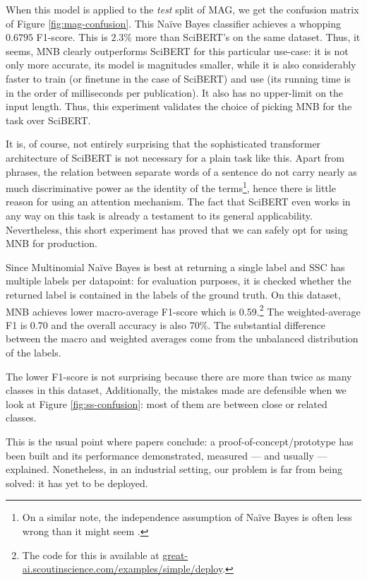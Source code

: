 When this model is applied to the \textit{test} split of MAG, we get the confusion matrix of Figure \ref{fig:mag-confusion}. This Naïve Bayes classifier achieves a whopping $0.6795$ F1-score. This is $2.3\%$ more than SciBERT's on the same dataset. Thus, it seems, MNB clearly outperforms SciBERT for this particular use-case: it is not only more accurate, its model is magnitudes smaller, while it is also considerably faster to train (or finetune in the case of SciBERT) and use (its running time is in the order of milliseconds per publication). It also has no upper-limit on the input length. Thus, this experiment validates the choice of picking MNB for the task over SciBERT.

It is, of course, not entirely surprising that the sophisticated transformer architecture of SciBERT is not necessary for a plain task like this. Apart from phrases, the relation between separate words of a sentence do not carry nearly as much discriminative power as the identity of the terms\footnote{On a similar note, the independence assumption of Naïve Bayes is often less wrong than it might seem \cite{hand2001idiot}.}, hence there is little reason for using an attention mechanism. The fact that SciBERT even works in any way on this task is already a testament to its general applicability. Nevertheless, this short experiment has proved that we can safely opt for using MNB for production.

Since Multinomial Naïve Bayes is best at returning a single label and SSC has multiple labels per datapoint: for evaluation purposes, it is checked whether the returned label is contained in the labels of the ground truth. On this dataset, MNB achieves lower macro-average F1-score which is 0.59.\footnote{The code for this is available at \href{https://great-ai.scoutinscience.com/examples/simple/deploy}{great-ai.scoutinscience.com/examples/simple/deploy}.} The weighted-average F1 is 0.70 and the overall accuracy is also 70\%. The substantial difference between the macro and weighted averages come from the unbalanced distribution of the labels.

The lower F1-score is not surprising because there are more than twice as many classes in this dataset,  Additionally, the mistakes made are defensible when we look at Figure \ref{fig:ss-confusion}: most of them are between close or related classes.

\begin{displayquote}
This is the usual point where papers conclude: a proof-of-concept/prototype has been built and its performance demonstrated, measured --- and usually --- explained. Nonetheless, in an industrial setting, our problem is far from being solved: it has yet to be deployed.
\end{displayquote}

